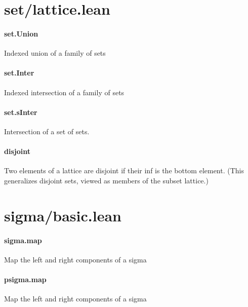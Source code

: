 \documentclass{article}
\begin{document}
\section{set/lattice.lean}\paragraph{set.Union}
\par
Indexed union of a family of sets
\paragraph{set.Inter}
\par
Indexed intersection of a family of sets
\paragraph{set.sInter}
\par
Intersection of a set of sets.
\paragraph{disjoint}
\par
Two elements of a lattice are disjoint if their inf is the bottom element.
(This generalizes disjoint sets, viewed as members of the subset lattice.)
\section{sigma/basic.lean}\paragraph{sigma.map}
\par
Map the left and right components of a sigma
\paragraph{psigma.map}
\par
Map the left and right components of a sigma
\end{document}

